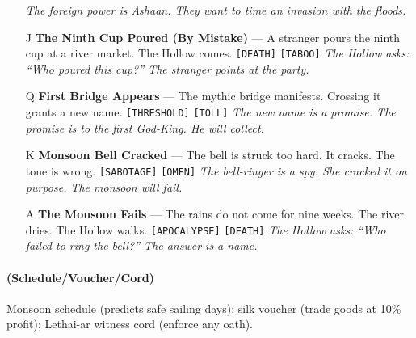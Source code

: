 \begin{enumerate}
  \hfill \textit{The foreign power is Ashaan. They want to time an invasion with the floods.}
\item[J] \textbf{The Ninth Cup Poured (By Mistake)} --- A stranger pours the ninth cup at a river market. The Hollow comes. \texttt{[DEATH]} \texttt{[TABOO]}
  \hfill \textit{The Hollow asks: ``Who poured this cup?'' The stranger points at the party.}
\item[Q] \textbf{First Bridge Appears} --- The mythic bridge manifests. Crossing it grants a new name. \texttt{[THRESHOLD]} \texttt{[TOLL]}
  \hfill \textit{The new name is a promise. The promise is to the first God-King. He will collect.}
\item[K] \textbf{Monsoon Bell Cracked} --- The bell is struck too hard. It cracks. The tone is wrong. \texttt{[SABOTAGE]} \texttt{[OMEN]}
  \hfill \textit{The bell-ringer is a spy. She cracked it on purpose. The monsoon will fail.}
\item[A] \textbf{The Monsoon Fails} --- The rains do not come for nine weeks. The river dries. The Hollow walks. \texttt{[APOCALYPSE]} \texttt{[DEATH]}
  \hfill \textit{The Hollow asks: ``Who failed to ring the bell?'' The answer is a name.}
\end{enumerate}

\paragraph*{(Schedule/Voucher/Cord)} Monsoon schedule (predicts safe sailing days); silk voucher (trade goods at 10\% profit); Lethai-ar witness cord (enforce any oath).

